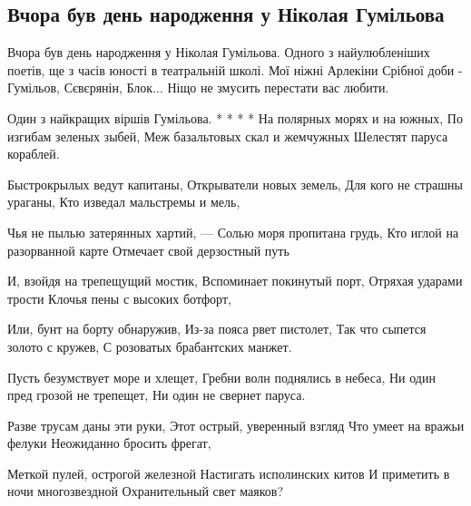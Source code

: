  
 
 
 
 
\subsection{Вчора був день народження у Ніколая Гумільова}

Вчора був день народження у Ніколая Гумільова. Одного з найулюбленіших поетів,
ще з часів юності в театральній школі. Мої ніжні Арлекіни Срібної доби -
Гумільов, Сєвєрянін, Блок... Ніщо не змусить перестати вас любити.

Один з найкращих віршів Гумільова.
*   *   *   *
На полярных морях и на южных,
По изгибам зеленых зыбей,
Меж базальтовых скал и жемчужных
Шелестят паруса кораблей.

Быстрокрылых ведут капитаны,
Открыватели новых земель,
Для кого не страшны ураганы,
Кто изведал мальстремы и мель,

Чья не пылью затерянных хартий, —
Солью моря пропитана грудь,
Кто иглой на разорванной карте
Отмечает свой дерзостный путь

И, взойдя на трепещущий мостик,
Вспоминает покинутый порт,
Отряхая ударами трости
Клочья пены с высоких ботфорт,

Или, бунт на борту обнаружив,
Из-за пояса рвет пистолет,
Так что сыпется золото с кружев,
С розоватых брабантских манжет.

Пусть безумствует море и хлещет,
Гребни волн поднялись в небеса,
Ни один пред грозой не трепещет,
Ни один не свернет паруса.

Разве трусам даны эти руки,
Этот острый, уверенный взгляд
Что умеет на вражьи фелуки
Неожиданно бросить фрегат,

Меткой пулей, острогой железной
Настигать исполинских китов
И приметить в ночи многозвездной
Охранительный свет маяков?

